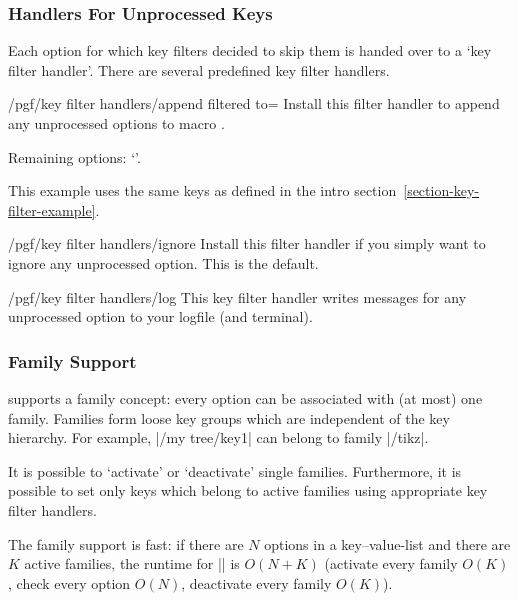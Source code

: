 \subsubsection{Handlers For Unprocessed Keys}

Each option for which key filters decided to skip them is handed over to a `key
filter handler'. There are several predefined key filter handlers.

\begin{key}{/pgf/key filter handlers/append filtered to=}
    Install this filter handler to append any unprocessed options to macro
    .
\begin{codeexample}[]
\def\remainingoptions{}

Remaining options: `\remainingoptions'.
\end{codeexample}
    This example uses the same keys as defined in the intro
    section~\ref{section-key-filter-example}.
\end{key}

\begin{key}{/pgf/key filter handlers/ignore}
    Install this filter handler if you simply want to ignore any unprocessed
    option. This is the default.
\end{key}

\begin{key}{/pgf/key filter handlers/log}
    This key filter handler writes messages for any unprocessed option to your
    logfile (and terminal).
\end{key}


\subsubsection{Family Support}

\pgfname{} supports a family concept: every option can be associated with (at
most) one family. Families form loose key groups which are independent of the
key hierarchy. For example, |/my tree/key1| can belong to family |/tikz|.

It is possible to `activate' or `deactivate' single families. Furthermore, it
is possible to set only keys which belong to active families using appropriate
key filter handlers.

The family support is fast: if there are $N$ options in a key--value-list and
there are $K$ active families, the runtime for |\pgfkeysfiltered| is $O(N+K)$
(activate every family $O(K)$, check every option $O(N)$, deactivate every
family $O(K)$).

